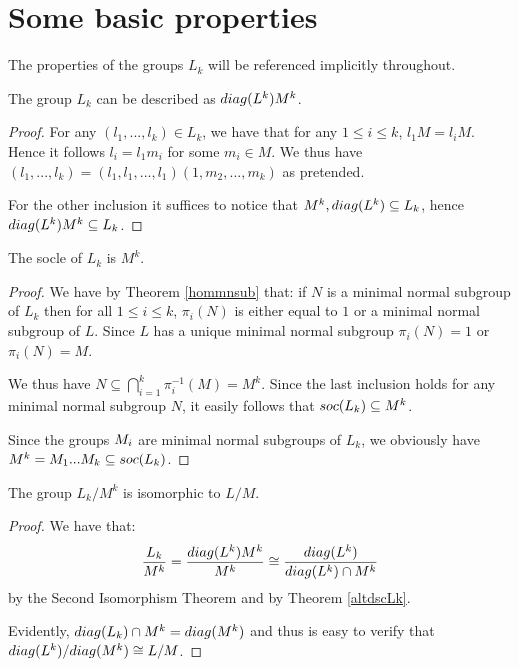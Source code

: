 \section{Some basic properties}
The properties of the groups \(L_k\) will be referenced implicitly throughout.


\begin{theorem}
    \label{altdscLk}
     The group $L_k$ can be described as $\diag{L^{k}}M^{k}$.
\end{theorem}

\begin{proof}
    For any $(l_1,...,l_k) \in L_k$, we have that for any $1 \le i \le k$, $l_1M = l_iM$. Hence it follows $l_i = l_1m_i$ for some $m_i \in M$. We thus have $(l_1,...,l_k) = (l_1,l_1,...,l_1)(1,m_2,...,m_k)$ as pretended. 
    
    For the other inclusion it suffices to notice that $M^k, \diag{L^k} \subseteq L_k$, hence $\diag{L^k}M^k \subseteq L_k$.
\end{proof}

\begin{theorem}
    The socle of $L_k$ is $M^k$.
\end{theorem}

\begin{proof}
    We have by Theorem \ref{hommnsub} that: if $N$ is a minimal normal subgroup of $L_k$ then for all $1 \le i \le k$, $\pi_i(N)$ is either equal to $1$ or a minimal normal subgroup of $L$. Since $L$ has a unique minimal normal subgroup $\pi_i(N) = 1$ or $\pi_i(N) = M$.
    
    We thus have $N \subseteq \bigcap_{i=1}^{k} \pi_i^{-1}(M) = M^{k}$. Since the last inclusion holds for any minimal normal subgroup $N$, it easily follows that $\soc{L_k} \subseteq M^k$.

    Since the groups $\Mi$ are minimal normal subgroups of $L_k$, we obviously have $M^k=\Mi[1]...\Mi[k] \subseteq \soc{L_k}$.
\end{proof}

\begin{theorem}
    \label{qtLksoc}
    The group $L_k/M^k$ is isomorphic to $L/M$.
\end{theorem}

\begin{proof}
    We have that:
    $$
        \frac{L_k}{M^k}=\frac{\diag{L^k}M^k}{M^k} \cong \frac{\diag{L^k}}{\diag{L^k} \cap M^k}
    $$
    by the Second Isomorphism Theorem and by Theorem \ref{altdscLk}. 
    
    Evidently, $\diag{L_k} \cap M^k = \diag{M^k}$ and thus is easy to verify that $\diag{L^k}/\diag{M^k} \cong L/M$.
\end{proof}

